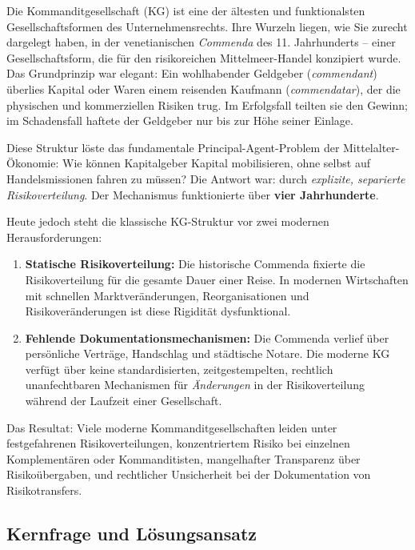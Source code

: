 \documentclass[a4paper,12pt]{article}
\theoremstyle{definition}
\begin{document}
Die Kommanditgesellschaft (KG) ist eine der ältesten und funktionalsten Gesellschaftsformen des Unternehmensrechts. Ihre Wurzeln liegen, wie Sie zurecht dargelegt haben, in der venetianischen \emph{Commenda} des 11. Jahrhunderts -- einer Gesellschaftsform, die für den risikoreichen Mittelmeer-Handel konzipiert wurde. Das Grundprinzip war elegant: Ein wohlhabender Geldgeber (\emph{commendant}) überlies Kapital oder Waren einem reisenden Kaufmann (\emph{commendatar}), der die physischen und kommerziellen Risiken trug. Im Erfolgsfall teilten sie den Gewinn; im Schadensfall haftete der Geldgeber nur bis zur Höhe seiner Einlage.

Diese Struktur löste das fundamentale Principal-Agent-Problem der Mittelalter-Ökonomie: Wie können Kapitalgeber Kapital mobilisieren, ohne selbst auf Handelsmissionen fahren zu müssen? Die Antwort war: durch \emph{explizite, separierte Risikoverteilung}. Der Mechanismus funktionierte über \textbf{vier Jahrhunderte}.

Heute jedoch steht die klassische KG-Struktur vor zwei modernen Herausforderungen:

\begin{enumerate}
    \item \textbf{Statische Risikoverteilung:} Die historische Commenda fixierte die Risikoverteilung für die gesamte Dauer einer Reise. In modernen Wirtschaften mit schnellen Marktveränderungen, Reorganisationen und Risikoveränderungen ist diese Rigidität dysfunktional.
    
    \item \textbf{Fehlende Dokumentationsmechanismen:} Die Commenda verlief über persönliche Verträge, Handschlag und städtische Notare. Die moderne KG verfügt über keine standardisierten, zeitgestempelten, rechtlich unanfechtbaren Mechanismen für \emph{Änderungen} in der Risikoverteilung während der Laufzeit einer Gesellschaft.
\end{enumerate}

Das Resultat: Viele moderne Kommanditgesellschaften leiden unter festgefahrenen Risikoverteilungen, konzentriertem Risiko bei einzelnen Komplementären oder Kommanditisten, mangelhafter Transparenz über Risikoübergaben, und rechtlicher Unsicherheit bei der Dokumentation von Risikotransfers.

\subsection{Kernfrage und Lösungsansatz}
\end{document}
